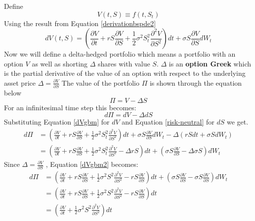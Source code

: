 \documentclass[12pt]{article}
\numberwithin{equation}{section}
\begin{document}
Define 
\begin{equation}
	V(t,S)  \equiv f(t,S_t)
\end{equation}
Using the result from Equation \ref{derivationbspde2}
\begin{equation}
	dV(t,S) = (\frac{\partial V}{\partial t} + rS \frac{\partial V}{\partial S} + 
	\frac{1}{2}\sigma^2S_t^2\frac{\partial^2 V}{\partial S^2}) dt + \sigma S \frac{\partial V}{\partial S}dW_t
	\label{dVgbm}
\end{equation}
\newline
Now we will define a delta-hedged portfolio which means a portfolio with an option $V$ as well as shorting $\Delta$ shares with value $S$.  \newline $\Delta$ is an \textbf{option Greek} which is the partial derivative of  the value of an option with respect to the underlying asset price $\Delta = \frac{\partial V}{\partial S}$  \newline The  value of the portfolio $\Pi$ is shown through the equation below
\begin{equation}
	\Pi = V - \Delta S 
	\label{portfolioDef}
\end{equation}
For an infinitesimal time step this becomes:
\begin{equation}
	d\Pi = dV - \Delta dS 
\end{equation}
Substituting Equation \ref{dVgbm} for $dV$ and Equation \ref{risk-neutral} for $dS$ we get. 
\begin{equation}
\begin{aligned}
	d\Pi &= (\frac{\partial V}{\partial t} + rS \frac{\partial V}{\partial S} + 
	\frac{1}{2}\sigma^2S_t^2\frac{\partial^2 V}{\partial S^2}) dt + \sigma S \frac{\partial V}{\partial S}dW_t - \Delta (rSdt + \sigma SdW_t)  \\
	&= (\frac{\partial V}{\partial t} + rS \frac{\partial V}{\partial S} + 
	\frac{1}{2}\sigma^2S_t^2\frac{\partial^2 V}{\partial S^2} - \Delta rS) dt + (\sigma S \frac{\partial V}{\partial S} - \Delta \sigma S ) dW_t
\end{aligned}
\label{dVgbm2}
\end{equation}
Since  $\Delta = \frac{\partial V}{\partial S}$ , Equation \ref{dVgbm2} becomes:
\begin{equation}
\begin{aligned}
	d\Pi &= (\frac{\partial V}{\partial t} + rS \frac{\partial V}{\partial S} + 
	\frac{1}{2}\sigma^2S^2\frac{\partial^2 V}{\partial S^2} -  rS \frac{\partial V}{\partial S} ) dt + (\sigma S \frac{\partial V}{\partial S} -\sigma S \frac{\partial V}{\partial S} ) dW_t \\
	&= (\frac{\partial V}{\partial t} + rS \frac{\partial V}{\partial S} + 
	\frac{1}{2}\sigma^2S^2\frac{\partial^2 V}{\partial S^2} -  rS \frac{\partial V}{\partial S} ) dt \\
	&= (\frac{\partial V}{\partial t} + 
	\frac{1}{2}\sigma^2S^2\frac{\partial^2 V}{\partial S^2} ) dt
\end{aligned}
\label{dVgbm3}
\end{equation}
\end{document}
